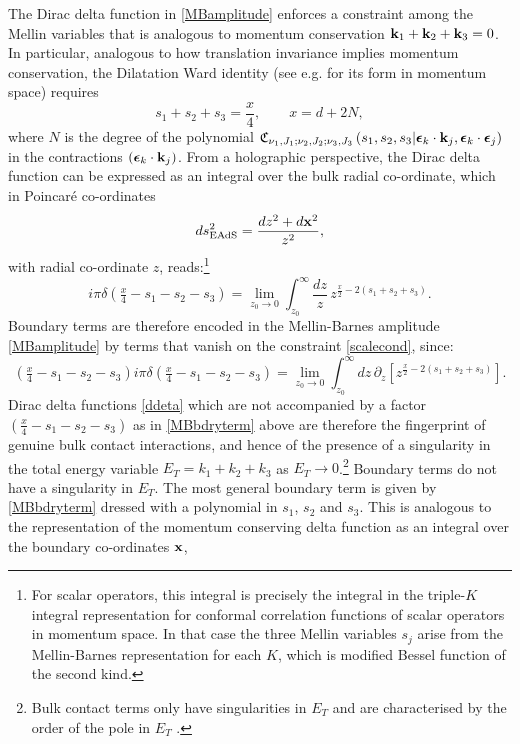 \documentclass[11pt,a4paper]{article}
\begin{document}
The Dirac delta function in \eqref{MBamplitude} enforces a constraint among the Mellin variables that is analogous to momentum conservation ${\bf k}_1+{\bf k}_2+{\bf k}_3=0$. In particular, analogous to how translation invariance implies momentum conservation, the Dilatation Ward identity (see e.g. \cite{Bzowski:2013sza} for its form in momentum space) requires
\begin{equation}
    s_1+s_2+s_3=\frac{x}{4}, \qquad x=d+2N,\label{scalecond}
\end{equation}
where $N$ is the degree of the polynomial $\mathfrak{C}_{\nu_1,J_1;\nu_2,J_2;\nu_3,J_3}\left(s_1,s_2,s_3|\boldsymbol{\epsilon}_k \cdot {\bf k}_j,\boldsymbol{\epsilon}_k \cdot \boldsymbol{\epsilon}_j\right)$ in the contractions $\left(\boldsymbol{\epsilon}_k \cdot {\bf k}_j\right)$. From a holographic perspective, the Dirac delta function can be expressed as an integral over the bulk radial co-ordinate, which in Poincar\'e co-ordinates
\begin{equation}
    ds^2_{\text{EAdS}} = \frac{dz^2+d{\bf x}^2}{z^2},
\end{equation}
with radial co-ordinate $z$, reads:\footnote{For scalar operators, this integral is precisely the integral in the triple-$K$ integral representation \cite{Bzowski:2013sza} for conformal correlation functions of scalar operators in momentum space. In that case the three Mellin variables $s_j$ arise from the Mellin-Barnes representation for each $K$, which is modified Bessel function of the second kind.}
\begin{equation}\label{ddeta}
  i \pi  \delta\left(\tfrac{x}{4}-s_1-s_2-s_3\right)= \lim_{z_0 \to 0}\int^{\infty}_{z_0}\frac{dz}{z}\, z^{\frac{x}{2}-2\left(s_1+s_2+s_3\right)}.
\end{equation}
Boundary terms are therefore encoded in the Mellin-Barnes amplitude \eqref{MBamplitude} by terms that vanish on the constraint \eqref{scalecond}, since:
\begin{equation}\label{MBbdryterm}
     \left(\tfrac{x}{4}-s_1-s_2-s_3\right)i \pi \delta\left(\tfrac{x}{4}-s_1-s_2-s_3\right) = \lim_{z_0 \to 0}\int_{z_0}^{\infty}dz\,\partial_{z}\left[ z^{\frac{x}{2}-2\left(s_1+s_2+s_3\right)}\right].
\end{equation}
Dirac delta functions \eqref{ddeta} which are not accompanied by a factor $\left(\tfrac{x}{4}-s_1-s_2-s_3\right)$ as in \eqref{MBbdryterm} above are therefore the fingerprint of genuine bulk contact interactions, and hence of the presence of a singularity in the total energy variable $E_T = k_1+k_2+k_3$ as $E_T \to 0$.\footnote{Bulk contact terms only have singularities in $E_T$ and are characterised by the order of the pole in $E_T$ \cite{Maldacena:2011nz,Raju:2012zr}.} Boundary terms do not have a singularity in $E_T$. The most general boundary term is given by \eqref{MBbdryterm} dressed with a polynomial in $s_1$, $s_2$ and $s_3$. This is analogous to the representation of the momentum conserving delta function as an integral over the boundary co-ordinates ${\bf x}$,
\end{document}
